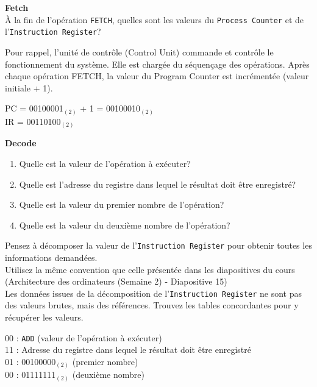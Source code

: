 \begin{Exercice}[5 minutes]\textbf{Fetch}\\
    À la fin de l'opération \lstinline{FETCH}, quelles sont les valeurs du \lstinline{Process Counter} et de l'\lstinline{Instruction Register}?
\end{Exercice}
   \begin{conseil}
    Pour rappel, l’unité de contrôle (Control Unit) commande et contrôle le fonctionnement du système. Elle est chargée du séquençage des opérations. Après chaque opération FETCH, la valeur du Program Counter est incrémentée (valeur initiale + 1).
    \end{conseil}
\begin{solution}
    PC = 00100001$_{(2)}$ + 1 = 00100010$_{(2)}$\\
    IR = 00110100$_{(2)}$
\end{solution}

\begin{Exercice}[5 minutes] \textbf{Decode}
    \begin{enumerate}
        \item Quelle est la valeur de l'opération à exécuter?
        \item Quelle est l'adresse du registre dans lequel le résultat doit être enregistré?
        \item Quelle est la valeur du premier nombre de l'opération?
        \item Quelle est la valeur du deuxième nombre de l'opération?
    \end{enumerate}
\end{Exercice}
   \begin{conseil}
    Pensez à décomposer la valeur de l’\lstinline{Instruction Register} pour obtenir toutes les informations demandées.\\
    Utilisez la même convention que celle présentée dans les diapositives du cours (Architecture des ordinateurs (Semaine 2) - Diapositive 15)\\
    Les données issues de la décomposition de l’\lstinline{Instruction Register} ne sont pas des valeurs brutes, mais des références. Trouvez les tables concordantes pour y récupérer les valeurs.

    \end{conseil}
\begin{solution}
    00 : \lstinline{ADD} (valeur de l'opération à exécuter)\\
    11 : Adresse du registre dans lequel le résultat doit être enregistré\\
    01 : 00100000$_{(2)}$ (premier nombre)\\
    00 : 01111111$_{(2)}$ (deuxième nombre)
\end{solution}

